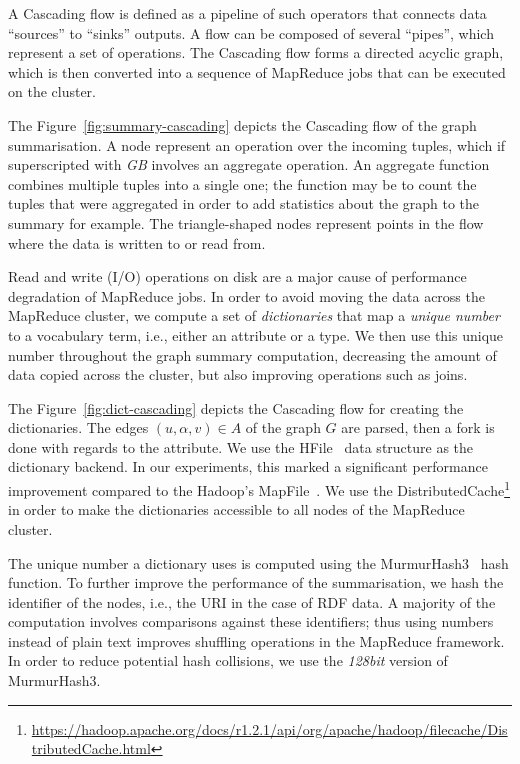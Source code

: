 A Cascading flow is defined as a pipeline of such operators that connects data ``sources'' to ``sinks'' outputs. A flow can be composed of several ``pipes'', which represent a set of operations. The Cascading flow forms a directed acyclic graph, which is then converted into a sequence of MapReduce jobs that can be executed on the cluster.

The Figure~\ref{fig:summary-cascading} depicts the Cascading flow of the graph summarisation. A node represent an operation over the incoming tuples, which if superscripted with \emph{GB} involves an aggregate operation. An aggregate function combines multiple tuples into a single one; the function may be to count the tuples that were aggregated in order to add statistics about the graph to the summary for example. The triangle-shaped nodes represent points in the flow where the data is written to or read from.


Read and write (I/O) operations on disk are a major cause of performance degradation of MapReduce jobs. In order to avoid moving the data across the MapReduce cluster, we compute a set of \emph{dictionaries} that map a \emph{unique number} to a vocabulary term, i.e., either an attribute or a type. We then use this unique number throughout the graph summary computation, decreasing the amount of data copied across the cluster, but also improving operations such as joins.

The Figure~\ref{fig:dict-cascading} depicts the Cascading flow for creating the dictionaries. The edges $(u, \alpha, v) \in A$ of the graph $G$ are parsed, then a fork is done with regards to the attribute. We use the HFile~\cite{hfile} data structure as the dictionary backend. In our experiments, this marked a significant performance improvement compared to the Hadoop's MapFile~\cite{mapfile}. We use the DistributedCache\footnote{\url{https://hadoop.apache.org/docs/r1.2.1/api/org/apache/hadoop/filecache/DistributedCache.html}} in order to make the dictionaries accessible to all nodes of the MapReduce cluster.

The unique number a dictionary uses is computed using the MurmurHash3~\cite{murmurhash3-gcode,murmurhash3-blog} hash function. To further improve the performance of the summarisation, we hash the identifier of the nodes, i.e., the URI in the case of RDF data. A majority of the computation involves comparisons against these identifiers; thus using numbers instead of plain text improves shuffling operations in the MapReduce framework. In order to reduce potential hash collisions, we use the \emph{128bit} version of MurmurHash3.

